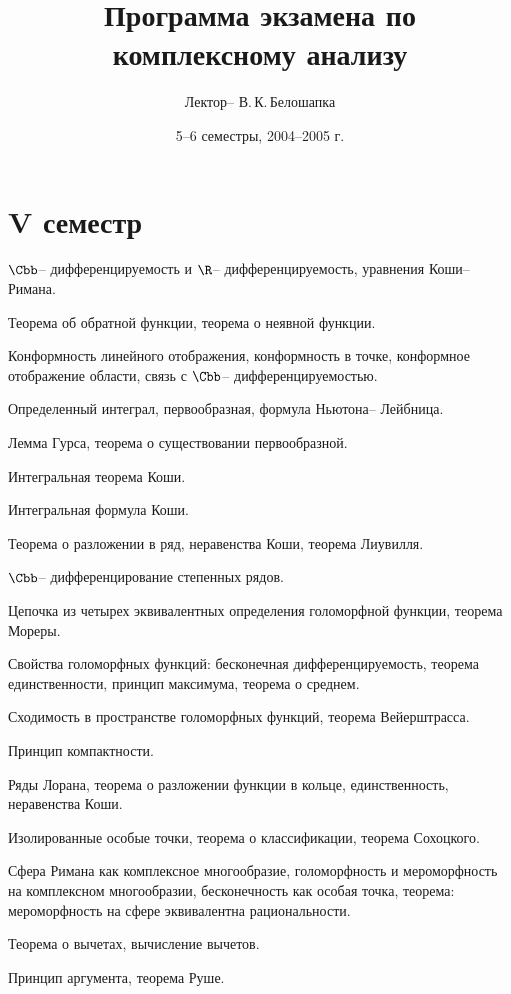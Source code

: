 \documentclass[a4paper]{article}
\title{Программа экзамена по  комплексному анализу}
\author{Лектор-- В.\,К.\,Белошапка}
\date{5--6 семестры, 2004--2005 г.}
\begin{document}
\maketitle

\section*{V семестр}

\begin{nums}{-2}
\item $\Cbb$-- дифференцируемость и $\R$-- дифференцируемость, уравнения Коши-- Римана.
\item Теорема об обратной функции,  теорема о неявной функции.
\item Конформность линейного отображения, конформность в точке, конформное отображение области,
      связь с $\Cbb$-- дифференцируемостью.
\item Определенный интеграл, первообразная, формула Ньютона-- Лейбница.
\item Лемма Гурса, теорема о существовании первообразной.
\item Интегральная теорема Коши.
\item Интегральная формула Коши.
\item Теорема о разложении в ряд, неравенства Коши, теорема Лиувилля.
\item $\Cbb$-- дифференцирование степенных рядов.
\item Цепочка из четырех эквивалентных определения голоморфной функции, теорема Мореры.
\item Свойства голоморфных функций: бесконечная дифференцируемость, теорема единственности,
      принцип максимума, теорема о среднем.
\item Сходимость в пространстве голоморфных функций, теорема Вейерштрасса.
\item Принцип компактности.
\item Ряды Лорана, теорема о разложении  функции в кольце, единственность, неравенства Коши.
\item Изолированные особые точки, теорема о классификации, теорема Сохоцкого.
\item Сфера Римана как комплексное многообразие, голоморфность и мероморфность на комплексном
      многообразии, бесконечность как особая точка,  теорема: мероморфность на сфере эквивалентна рациональности.
\item Теорема о вычетах, вычисление вычетов.
\item Принцип аргумента, теорема Руше.

\end{nums}
\end{document}
